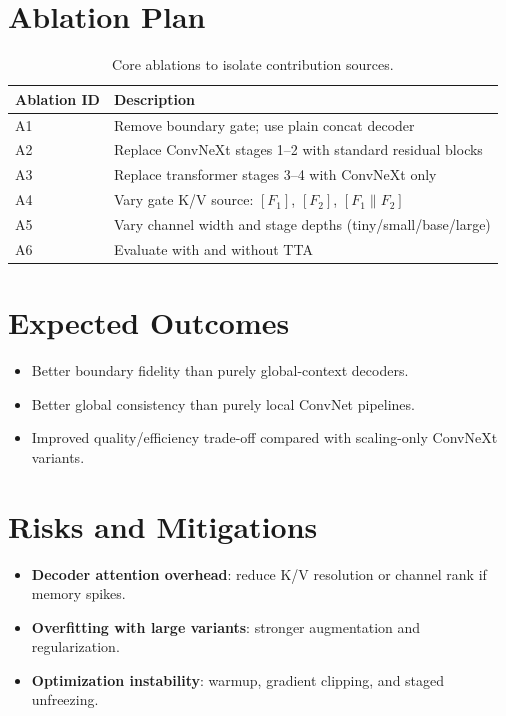 \documentclass[11pt]{article}
\begin{document}
\section{Ablation Plan}
\begin{table}[h]
\centering
\caption{Core ablations to isolate contribution sources.}
\begin{tabular}{@{}ll@{}}
\toprule
Ablation ID & Description \\
\midrule
A1 & Remove boundary gate; use plain concat decoder \\
A2 & Replace ConvNeXt stages 1--2 with standard residual blocks \\
A3 & Replace transformer stages 3--4 with ConvNeXt only \\
A4 & Vary gate K/V source: $[F_1]$, $[F_2]$, $[F_1\|F_2]$ \\
A5 & Vary channel width and stage depths (tiny/small/base/large) \\
A6 & Evaluate with and without TTA \\
\bottomrule
\end{tabular}
\end{table}

\section{Expected Outcomes}
\begin{itemize}[leftmargin=1.4em]
    \item Better boundary fidelity than purely global-context decoders.
    \item Better global consistency than purely local ConvNet pipelines.
    \item Improved quality/efficiency trade-off compared with scaling-only ConvNeXt variants.
\end{itemize}

\section{Risks and Mitigations}
\begin{itemize}[leftmargin=1.4em]
    \item \textbf{Decoder attention overhead}: reduce K/V resolution or channel rank if memory spikes.
    \item \textbf{Overfitting with large variants}: stronger augmentation and regularization.
    \item \textbf{Optimization instability}: warmup, gradient clipping, and staged unfreezing.
\end{itemize}
\end{document}
